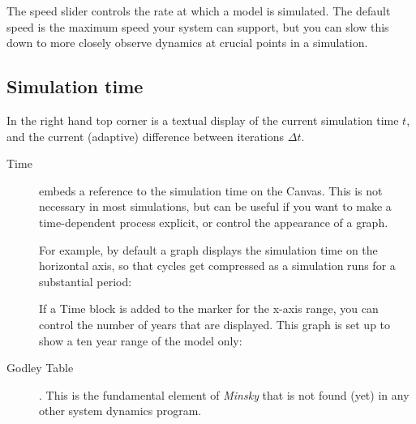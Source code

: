 The speed slider controls the rate at which a model is simulated.
The default speed is the maximum speed your system can support, but
you can slow this down to more closely observe dynamics at crucial
points in a simulation.

\subsection{Simulation time}

\label{SimTime}

In the right hand top corner is a textual display of the current simulation
time $t$, and the current (adaptive) difference between iterations
$\Delta t$.
\begin{description}
\item [{Time}]  embeds a reference to the simulation
time on the Canvas. This is not necessary in most simulations, but
can be useful if you want to make a time-dependent process explicit,
or control the appearance of a graph.

For example, by default a graph displays the simulation time on the
horizontal axis, so that cycles get compressed as a simulation runs
for a substantial period:
\begin{center}
\par\end{center}

If a Time block is added to the marker for the x-axis range, you can
control the number of years that are displayed. This graph is set
up to show a ten year range of the model only:
\begin{center}
\par\end{center}
\item [{Godley Table}] . This is the fundamental
element of \emph{Minsky} that is not found (yet) in any other system
dynamics program.


\end{description}
